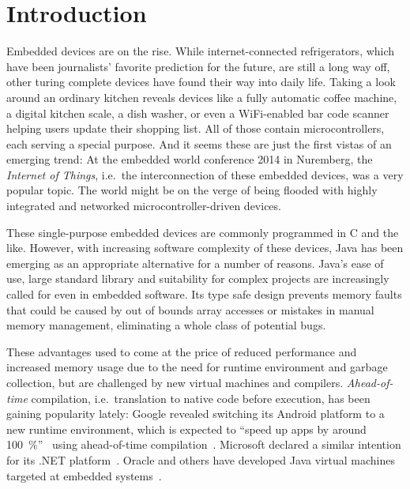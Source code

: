 
\chapter{Introduction}
	\label{chapter:intro}
	Embedded devices are on the rise. While internet-connected refrigerators, which have been journalists' favorite
	prediction for the future, are still a long way off, other turing complete devices have found their way into daily
	life. Taking a look around an ordinary kitchen reveals devices like a fully automatic coffee machine, a digital
	kitchen scale, a dish washer, or even a WiFi-enabled bar code scanner helping users update their shopping list. All of
	those contain microcontrollers, each serving a special purpose. And it seems these are just the first vistas of an
	emerging trend: At the embedded world conference 2014 in Nuremberg, the \emph{Internet of Things}, i.e.\ the
	interconnection of these embedded devices, was a very popular topic. The world might be on the verge of being flooded
	with highly integrated and networked microcontroller-driven devices.


	These single-purpose embedded devices are commonly programmed in C and the like. However, with increasing software
	complexity of these devices, Java has been emerging as an appropriate alternative for a number of reasons. Java's ease
	of use, large standard library and suitability for complex projects are increasingly called for even in embedded
	software. Its type safe design prevents memory faults that could be caused by out of bounds array accesses or mistakes
	in manual memory management, eliminating a whole class of potential bugs.

	These advantages used to come at the price of reduced performance and increased memory usage due to the need for
	runtime environment and garbage collection, but are challenged by new virtual machines and compilers.
	\emph{Ahead-of-time} compilation, i.e.\ translation to native code before execution, has been gaining popularity
	lately: Google revealed switching its Android platform to a new runtime environment, which is expected to
	\enquote{speed up apps by around 100~\%}~\cite{anthony:13:android-art} using ahead-of-time
	compilation~\cite{lindner:14:android-art}. Microsoft declared a similar intention for its .NET
	platform~\cite{lardinois:14:dotnet-aot}. Oracle and others have developed Java virtual machines targeted at embedded
	systems~\cite{merritt:13:java-for-IoT, maxfield:12:IS2T-JVM}.

